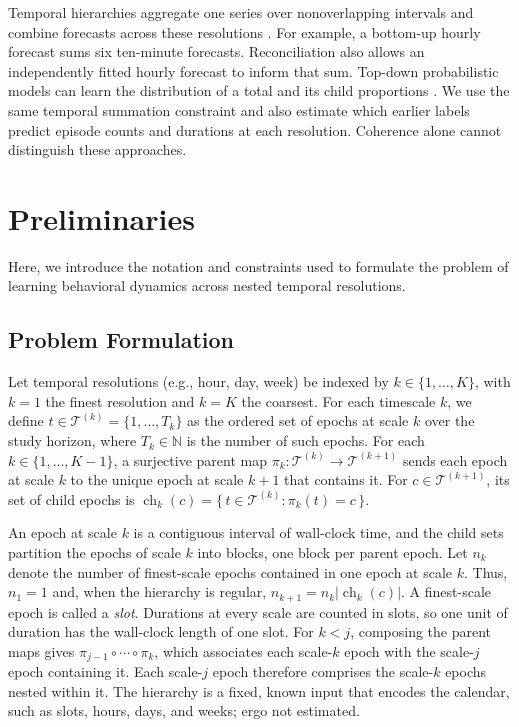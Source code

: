 \documentclass[sigconf]{acmart}
\begin{document}
Temporal hierarchies aggregate one series over nonoverlapping intervals and combine forecasts across these resolutions \citep{athanasopoulos_temporal_2017}. For example, a bottom-up hourly forecast sums six ten-minute forecasts. Reconciliation also allows an independently fitted hourly forecast to inform that sum. Top-down probabilistic models can learn the distribution of a total and its child proportions \citep{das_topdown_2023}. We use the same temporal summation constraint and also estimate which earlier labels predict episode counts and durations at each resolution. Coherence alone cannot distinguish these approaches.



\section{Preliminaries}
\label{sec:preliminaries}

Here, we introduce the notation and constraints used to formulate the problem of learning behavioral dynamics across nested temporal resolutions.

\subsection{Problem Formulation}
\label{sec:problem_formulation}

Let temporal resolutions (e.g., hour, day, week) be indexed by \(k \in \{1,\dots,K\}\), with \(k=1\) the finest resolution and \(k=K\) the coarsest. For each timescale \(k\), we define \(t\in\mathcal{T}^{(k)} = \{1,\dots,T_k\}\) as the ordered set of epochs at scale \(k\) over the study horizon, where \(T_k \in \mathbb{N}\) is the number of such epochs. For each \(k \in \{1,\dots,K-1\}\), a surjective parent map \(\pi_k : \mathcal{T}^{(k)} \to \mathcal{T}^{(k+1)}\) sends each epoch at scale \(k\) to the unique epoch at scale \(k+1\) that contains it. For \(c \in \mathcal{T}^{(k+1)}\), its set of child epochs is \(\operatorname{ch}_k(c) = \{\,t \in \mathcal{T}^{(k)} : \pi_k(t) = c\,\}\).

An epoch at scale \(k\) is a contiguous interval of wall-clock time, and the child sets partition the epochs of scale \(k\) into blocks, one block per parent epoch. Let \(n_k\) denote the number of finest-scale epochs contained in one epoch at scale \(k\). Thus, \(n_1=1\) and, when the hierarchy is regular, \(n_{k+1} = n_k\lvert\operatorname{ch}_k(c)\rvert\). A finest-scale epoch is called a \emph{slot}. Durations at every scale are counted in slots, so one unit of duration has the wall-clock length of one slot. For \(k<j\), composing the parent maps gives \(\pi_{j-1} \circ \cdots \circ \pi_k\), which associates each scale-\(k\) epoch with the scale-\(j\) epoch containing it. Each scale-\(j\) epoch therefore comprises the scale-\(k\) epochs nested within it. The hierarchy is a fixed, known input that encodes the calendar, such as slots, hours, days, and weeks; ergo not estimated.
\end{document}
